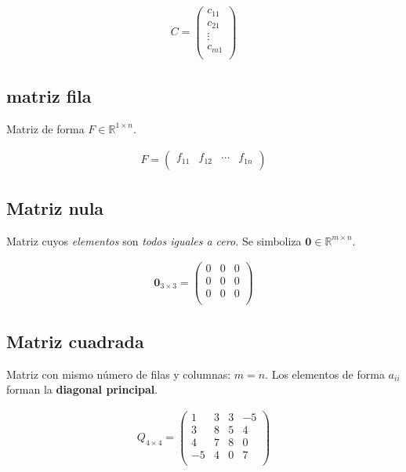 \documentclass[12pt]{article}
\begin{document}
\begin{align*}
  C = \begin{pmatrix}
        c_{11} \\
        c_{21} \\
        \vdots \\
        c_{m1} \\
      \end{pmatrix}
\end{align*}

\subsection{matriz fila}

Matriz de forma \(F \in \mathbb{R}^{1 \times n}\).

\begin{align*}
  F = \begin{pmatrix}
        f_{11} & f_{12} & \cdots & f_{1n} \\
      \end{pmatrix}
\end{align*}

\subsection{Matriz nula}

Matriz cuyos \textit{elementos} son \textit{todos iguales a cero.}
Se simboliza \(\mathbf{0} \in \mathbb{R}^{m \times n}\).

\begin{align*}
  \mathbf{0}_{3 \times 3} = \begin{pmatrix}
                              0 & 0 & 0 \\
                              0 & 0 & 0 \\
                              0 & 0 & 0 \\
                            \end{pmatrix}
\end{align*}

\subsection{Matriz cuadrada}

Matriz con mismo número de filas y columnas: \(m = n\).
Los elementos de forma \(a_{ii}\) forman la \textbf{diagonal principal}.

\begin{align*}
  Q_{4 \times 4} = \begin{pmatrix}
                     1  & 3 & 3 & -5 \\
                     3  & 8 & 5 & 4  \\
                     4  & 7 & 8 & 0  \\
                     -5 & 4 & 0 & 7  \\
                   \end{pmatrix}
\end{align*}
\end{document}
